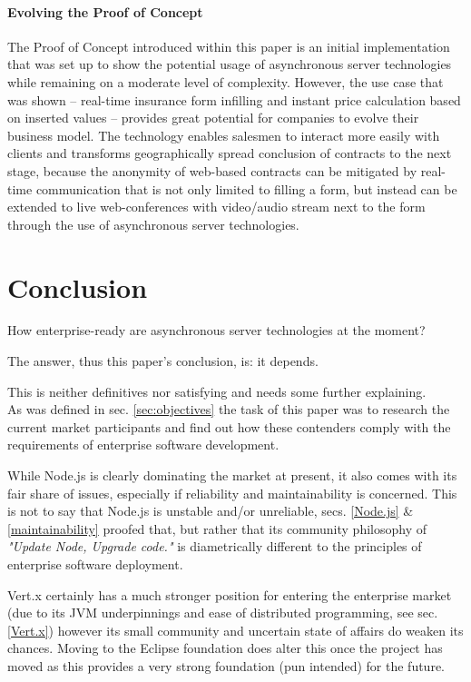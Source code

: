 \paragraph{Evolving the Proof of Concept} The Proof of Concept introduced within this paper is an initial implementation that was set up to show the potential usage of asynchronous server technologies while remaining on a moderate level of complexity. However, the use case that was shown -- real-time insurance form infilling and instant price calculation based on inserted values -- provides great potential for companies to evolve their business model. The technology enables salesmen to interact more easily with clients and transforms geographically spread conclusion of contracts to the next stage, because the anonymity of web-based contracts can be mitigated by real-time communication that is not only limited to filling a form, but instead can be extended to live web-conferences with video/audio stream next to the form through the use of asynchronous server technologies. 


\section{Conclusion}
\label{conclusion}
How enterprise-ready are asynchronous server technologies at the moment?

The answer, thus this paper's conclusion, is: it depends.

This is neither definitives nor satisfying and needs some further explaining.\\

As was defined in sec. \ref{sec:objectives} the task of this paper was to research the current market participants and find out how these contenders comply with the requirements of enterprise software development.

While Node.js is clearly dominating the market at present, it also comes with its fair share of issues, especially if reliability and maintainability is concerned. This is not to say that Node.js is unstable and/or unreliable, secs. \ref{Node.js} \& \ref{maintainability} proofed that, but rather that its community philosophy of \textit{"Update Node, Upgrade code."} is diametrically different to the principles of enterprise software deployment.

Vert.x certainly has a much stronger position for entering the enterprise market (due to its JVM underpinnings and ease of distributed programming, see sec. \ref{Vert.x}) however its small community and uncertain state of affairs do weaken its chances. Moving to the Eclipse foundation does alter this once the project has moved as this provides a very strong foundation (pun intended) for the future.\\

